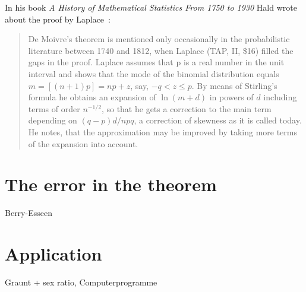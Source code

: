 In his book \emph{A History of Mathematical Statistics From 1750 to 1930} Hald wrote about the proof by Laplace~\cite[p. 24]{hald2}:

\begin{quotation}
  De Moivre's theorem is mentioned only occasionally in the probabilistic literature between 1740 and 1812, when Laplace (TAP, II, \$16)  filled the gaps in the proof. Laplace assumes that p is a real number in the unit interval  and shows that the mode of the binomial distribution equals $m=[(n+1)p]=np+z$, say, $-q < z \le p$. By means of Stirling's formula he obtains an expansion of $\ln(m+d)$ in powers of $d$ including terms of order $n^{-1/2}$, so that he gets a correction to the main term depending on $(q-p)d/npq$, a correction of skewness as it is called today. He notes, that the approximation may be improved by taking more terms of the expansion into account.
\end{quotation}


\section{The error in the theorem}

Berry-Esseen

\section{Application}

Graunt + sex ratio, Computerprogramme
